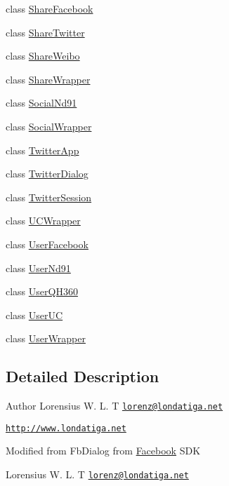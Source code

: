 \begin{DoxyCompactItemize}
\item 
class \hyperlink{classorg_1_1cocos2dx_1_1plugin_1_1ShareFacebook}{Share\+Facebook}
\item 
class \hyperlink{classorg_1_1cocos2dx_1_1plugin_1_1ShareTwitter}{Share\+Twitter}
\item 
class \hyperlink{classorg_1_1cocos2dx_1_1plugin_1_1ShareWeibo}{Share\+Weibo}
\item 
class \hyperlink{classorg_1_1cocos2dx_1_1plugin_1_1ShareWrapper}{Share\+Wrapper}
\item 
class \hyperlink{classorg_1_1cocos2dx_1_1plugin_1_1SocialNd91}{Social\+Nd91}
\item 
class \hyperlink{classorg_1_1cocos2dx_1_1plugin_1_1SocialWrapper}{Social\+Wrapper}
\item 
class \hyperlink{classorg_1_1cocos2dx_1_1plugin_1_1TwitterApp}{Twitter\+App}
\item 
class \hyperlink{classorg_1_1cocos2dx_1_1plugin_1_1TwitterDialog}{Twitter\+Dialog}
\item 
class \hyperlink{classorg_1_1cocos2dx_1_1plugin_1_1TwitterSession}{Twitter\+Session}
\item 
class \hyperlink{classorg_1_1cocos2dx_1_1plugin_1_1UCWrapper}{U\+C\+Wrapper}
\item 
class \hyperlink{classorg_1_1cocos2dx_1_1plugin_1_1UserFacebook}{User\+Facebook}
\item 
class \hyperlink{classorg_1_1cocos2dx_1_1plugin_1_1UserNd91}{User\+Nd91}
\item 
class \hyperlink{classorg_1_1cocos2dx_1_1plugin_1_1UserQH360}{User\+Q\+H360}
\item 
class \hyperlink{classorg_1_1cocos2dx_1_1plugin_1_1UserUC}{User\+UC}
\item 
class \hyperlink{classorg_1_1cocos2dx_1_1plugin_1_1UserWrapper}{User\+Wrapper}
\end{DoxyCompactItemize}


\subsection{Detailed Description}
\begin{DoxyAuthor}{Author}
Lorensius W. L. T \href{mailto:lorenz@londatiga.net}{\tt lorenz@londatiga.\+net}
\end{DoxyAuthor}
\href{http://www.londatiga.net}{\tt http\+://www.\+londatiga.\+net}

Modified from Fb\+Dialog from \hyperlink{interfaceFacebook}{Facebook} S\+DK

Lorensius W. L. T \href{mailto:lorenz@londatiga.net}{\tt lorenz@londatiga.\+net} 